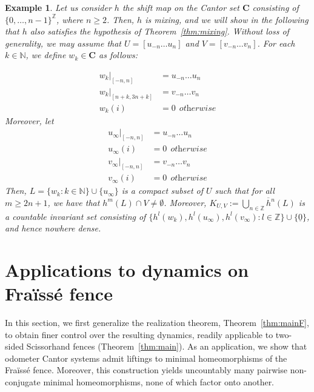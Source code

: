\documentclass[11pt]{amsart}
\newtheorem{example}[theorem]{Example}
\newcommand{\N}{\mathbb{N}}  %
\newcommand{\Z}{\mathbb{Z}}  %
\newcommand{\cantor}{\mathbf C}
\begin{document}
{\begin{example}\label{rmk:mixing}
    Let us consider $h$ the shift map on the Cantor set $\cantor$ consisting of $\{0,\ldots, n-1\}^{\Z}$, where  $n \ge 2$. Then, $h$ is mixing, and we will show in the following that $h$ also satisfies the hypothesis of Theorem~\ref{thm:mixing}. Without loss of generality, we may assume that $U=[u_{-n}\ldots u_n]$ and $V=[v_{-n}\ldots v_n]$. For each $k \in \N$, we define $w_k \in \cantor$ as follows: 

   \begin{align*}
        w_k|_{[-n,n]} &=  u_{-n}\ldots u_n\\
         w_k|_{[n+k, 3n+k]} &= v_{-n}\ldots v_n\\
         w_k (i) & = 0  \ \ \textit {otherwise}\end{align*} 
         Moreover, let  
         \begin{align*}
        u_{\infty}|_{[-n,n]} &=  u_{-n}\ldots u_n\\
         u_{\infty} (i) &= 0  \ \
         \textit{otherwise}
         \\
         v_{\infty}|_{[-n,n]} &=  v_{-n}\ldots v_n\\
         v_{\infty} (i) &= 0  \ \ \textit{otherwise}
         \end{align*} 
         Then, $L = \{w_k: k \in \N\} \cup \{ u_{\infty}\}$ is a compact subset of $U$ such that for all $m \ge 2n+1$, we have that $h^m(L) \cap V \neq \emptyset$. Moreover,  $K_{U,V}:=\overline{\bigcup_{n \in \mathbb{Z}} h^n(L)}$ is  a countable  invariant set consisting of $\{ h^l(w_k), h^l(u_{\infty}), h^l(v_{\infty}): l \in \Z \} \cup \{\underline{0}\}$, and hence nowhere dense.
\end{example}

\section{Applications to dynamics on Fra\"iss\'e fence}\label{sec: Applications to dynamics on Fraisse fence}

In this section, we first generalize the realization theorem, Theorem~\ref{thm:mainF}, to obtain finer control over the resulting dynamics, readily applicable to two-sided Scissorhand fences (Theorem~\ref{thm:main}). As an application, we show that odometer Cantor systems admit liftings to minimal homeomorphisms of the Fra\"iss\'e fence. Moreover, this construction yields uncountably many pairwise non-conjugate minimal homeomorphisms, none of which factor onto another.

}
\end{document}
